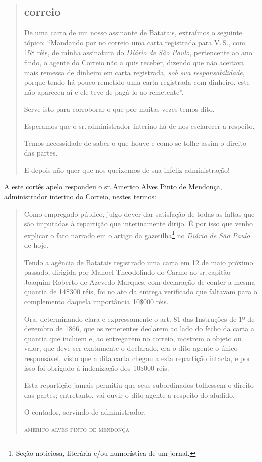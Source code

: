 \begin{quote}
\subsection{correio}

De uma carta de um nosso assinante de Batatais, extraímos o seguinte
tópico: ``Mandando por no correio uma carta registrada para V.\,S., com
15\$ réis, de minha assinatura do \emph{Diário de São Paulo}, pertencente
ao ano findo, o agente do Correio não a quis receber, dizendo que não
aceitava mais remessa de dinheiro em carta registrada, \emph{sob sua
responsabilidade}, porque tendo há pouco remetido uma carta registrada
com dinheiro, este não apareceu aí e ele teve de pagá-lo ao remetente''.

Serve isto para corroborar o que por muitas vezes temos dito.

Esperamos que o sr.\,administrador interino há de nos esclarecer a
respeito.

Temos necessidade de saber o que houve e como se tolhe assim o direito
das partes.

E depois não quer que nos queixemos de sua infeliz administração!
\end{quote}

A este cortês apelo respondeu o sr.\,Americo Alves Pinto de Mendonça,
administrador interino do Correio, nestes termos:

\begin{quote}
Como empregado público, julgo dever dar satisfação de todas as faltas
que são imputadas à repartição que interinamente dirijo. É por isso que
venho explicar o fato narrado em o artigo da gazetilha\footnote{Seção
  noticiosa, literária e/ou humorística de um jornal.} no \emph{Diário
de São Paulo} de hoje.

Tendo a agência de Batatais registrado uma carta em 12 de maio próximo
passado, dirigida por Manoel Theodolindo do Carmo ao sr.\,capitão Joaquim
Roberto de Azevedo Marques, com declaração de conter a mesma quantia de
14\$300 réis, foi no ato da entrega verificado que faltavam para o
complemento daquela importância 10\$000 réis.

Ora, determinando clara e expressamente o art. 81 das Instruções de 1º
de dezembro de 1866, que os remetentes declarem ao lado do fecho da
carta a quantia que incluem e, ao entregarem no correio, mostrem o
objeto ou valor, que deve ser exatamente o declarado, era o dito agente
o único responsável, visto que a dita carta chegou a esta repartição
intacta, e por isso foi obrigado à indenização dos 10\$000 réis.

Esta repartição jamais permitiu que seus subordinados tolhessem o
direito das partes; entretanto, vai ouvir o dito agente a respeito do
aludido.

\begin{flushright}
O contador, servindo de administrador,

\textsc{americo alves pinto de mendonça}
\end{flushright}
\end{quote}

